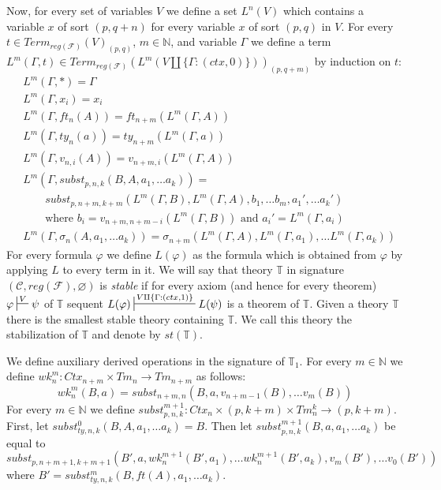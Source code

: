 \documentclass[reqno]{amsart}
\theoremstyle{definition}
\theoremstyle{remark}
\numberwithin{figure}{section}
\begin{document}
Now, for every set of variables $V$ we define a set $L^n(V)$ which contains a variable $x$ of sort $(p,q+n)$ for every variable $x$ of sort $(p,q)$ in $V$.
For every $t \in Term_{reg(\mathcal{F})}(V)_{(p,q)}$, $m \in \mathbb{N}$, and variable $\Gamma$ we define a term $L^m(\Gamma, t) \in Term_{reg(\mathcal{F})}(L^m(V \amalg \{ \Gamma : (ctx,0) \}))_{(p,q+m)}$ by induction on $t$:
\begin{align*}
& L^m(\Gamma, *) = \Gamma \\
& L^m(\Gamma, x_i) = x_i \\
& L^m(\Gamma, ft_n(A)) = ft_{n+m}(L^m(\Gamma, A)) \\
& L^m(\Gamma, ty_n(a)) = ty_{n+m}(L^m(\Gamma, a)) \\
& L^m(\Gamma, v_{n,i}(A)) = v_{n+m,i}(L^m(\Gamma, A)) \\
& L^m(\Gamma, subst_{p,n,k}(B, A, a_1, \ldots a_k)) = \\
& \qquad subst_{p,n+m,k+m}(L^m(\Gamma, B), L^m(\Gamma, A), b_1, \ldots b_m, a_1', \ldots a_k') \\
& \qquad \text{where $b_i = v_{n+m,n+m-i}(L^m(\Gamma, B))$ and $a_i' = L^m(\Gamma, a_i)$ } \\
& L^m(\Gamma, \sigma_n(A, a_1, \ldots a_k)) = \sigma_{n+m}(L^m(\Gamma, A), L^m(\Gamma, a_1), \ldots L^m(\Gamma, a_k))
\end{align*}
For every formula $\varphi$ we define $L(\varphi)$ as the formula which is obtained from $\varphi$ by applying $L$ to every term in it.
We will say that theory $\mathbb{T}$ in signature $(\mathcal{C}, reg(\mathcal{F}), \varnothing)$ is \emph{stable}
if for every axiom (and hence for every theorem) $\varphi \sststile{}{V} \psi$ of $\mathbb{T}$ sequent $L(\varphi) \sststile{}{V \amalg \{ \Gamma : (ctx,1) \}} L(\psi)$ is a theorem of $\mathbb{T}$.
Given a theory $\mathbb{T}$ there is the smallest stable theory containing $\mathbb{T}$.
We call this theory the stabilization of $\mathbb{T}$ and denote by $st(\mathbb{T})$.

We define auxiliary derived operations in the signature of $\mathbb{T}_1$.
For every $m \in \mathbb{N}$ we define $wk^m_n : Ctx_{n+m} \times Tm_n \to Tm_{n+m}$ as follows:
\[ wk^m_n(B,a) = subst_{n+m,n}(B, a, v_{n+m-1}(B), \ldots v_m(B)) \]
For every $m \in \mathbb{N}$ we define $subst^{m+1}_{p,n,k} : Ctx_n \times (p,k+m) \times Tm^k_n \to (p,k+m)$.
First, let $subst^0_{ty,n,k}(B, A, a_1, \ldots a_k) = B$.
Then let $subst^{m+1}_{p,n,k}(B, a, a_1, \ldots a_k)$ be equal to
\[ subst_{p,n+m+1,k+m+1}(B', a, wk^{m+1}_n(B', a_1), \ldots wk^{m+1}_n(B', a_k), v_m(B'), \ldots v_0(B')) \]
where $B' = subst^m_{ty,n,k}(B, ft(A), a_1, \ldots a_k)$.
\end{document}
